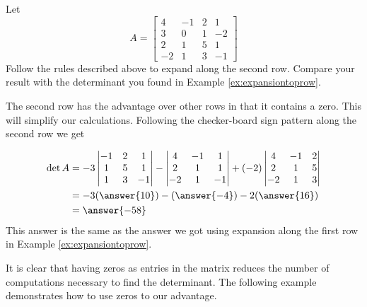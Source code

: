 \documentclass{ximera}
\begin{document}
 \begin{example}\label{ex:laplace1}
Let  
$$A=\begin{bmatrix}4&-1&2&1\\3&0&1&-2\\
2&1&5&1\\-2&1&3&-1\end{bmatrix}$$
Follow the rules described above to expand along the second row.  Compare your result with the determinant you found in Example \ref{ex:expansiontoprow}.
\begin{explanation}

 The second row has the advantage over other rows in that it contains a zero.  This will simplify our calculations.  Following the checker-board sign pattern along the second row we get

\begin{align*}
\det{A}
&=-3\begin{vmatrix}-1&2&1\\1&5&1\\1&3&-1\end{vmatrix}-\begin{vmatrix}4&-1&1\\2&1&1\\-2&1&-1\end{vmatrix}+(-2)\begin{vmatrix}4&-1&2\\2&1&5\\-2&1&3\end{vmatrix}\\&=-3(\answer{10})-(\answer{-4})-2(\answer{16})\\
&=\answer{-58}
\end{align*}
This answer is the same as the answer we got using expansion along the first row in Example \ref{ex:expansiontoprow}.
    
\end{explanation}
 \end{example}
 
It is clear that having zeros as entries in the matrix reduces the number of computations necessary to find the determinant.  The following example demonstrates how to use zeros to our advantage.
\end{document}
